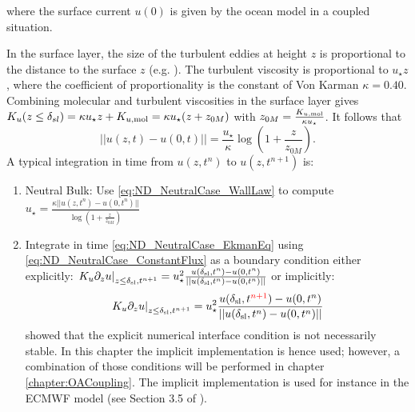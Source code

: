 where the surface current $u(0)$ is given by the ocean model
in a coupled situation.
%
\par
In the surface layer, the size of the turbulent eddies at height $z$
is proportional to the distance to the surface $z$
(e.g. \cite{kawai_wall-modeling_2012}). The turbulent viscosity
is proportional to $u_\star z$, where the coefficient of
proportionality is the constant of Von Karman $\kappa = 0.40$.
Combining molecular and turbulent viscosities in the surface layer
gives $K_u(z\leq \delta_{sl}) = \kappa u_\star z + K_{u, {\rm mol}}
= \kappa u_\star (z + z_{0M})$ with $z_{0M} = \frac{K_{u, {\rm mol}}}{\kappa u_\star}$.
It follows that
\begin{equation}
\label{eq:ND_NeutralCase_WallLaw}
	||u(z, t) - u(0, t)|| = \frac{{u_\star}}{\kappa}
	\log(1+\frac{z}{z_{0M}}).
\end{equation}
A typical integration in time from $u(z, t^{n})$ to
$u(z, t^{n+1})$ is:
\begin{enumerate}
	\item Neutral Bulk: Use \eqref{eq:ND_NeutralCase_WallLaw}
	  to compute $u_\star = \frac{\kappa ||u(z, t^n)-u(0, t^n)||}
			{\log(1+\frac{z}{z_{0M}})}$
  \item Integrate in time \eqref{eq:ND_NeutralCase_EkmanEq}
  using \eqref{eq:ND_NeutralCase_ConstantFlux} as a boundary condition
		either explicitly: $\left.K_u \partial_z u
		\right|_{z\leq \delta_{\rm sl}, t^{n+1}}
		= u_\star^2 \frac{u(\delta_{\rm sl}, t^n)-u(0,t^n)}
		{||u(\delta_{\rm sl}, t^n)-u(0,t^n)||}$
		or implicitly:
	\begin{equation}
		\left.K_u \partial_z u
		\right|_{z\leq \delta_{\rm sl}, t^{n+1}}
		= u_\star^2 \frac{u(\delta_{\rm sl},
		t^{\color{red} n+1})-u(0,t^n)}
		{||u(\delta_{\rm sl}, t^n)-u(0,t^n)||}
	\end{equation}
	\cite{lemarie_stability_2015} showed that the explicit
	numerical interface condition is not necessarily
	stable.
	In this chapter the implicit implementation is hence used;
	however, a combination of those conditions
	will be performed in chapter \ref{chapter:OACoupling}.
	The implicit implementation is used for instance in the
	ECMWF model (see Section 3.5 of \citep{ecmwf_ifs_2020}).
\end{enumerate}

